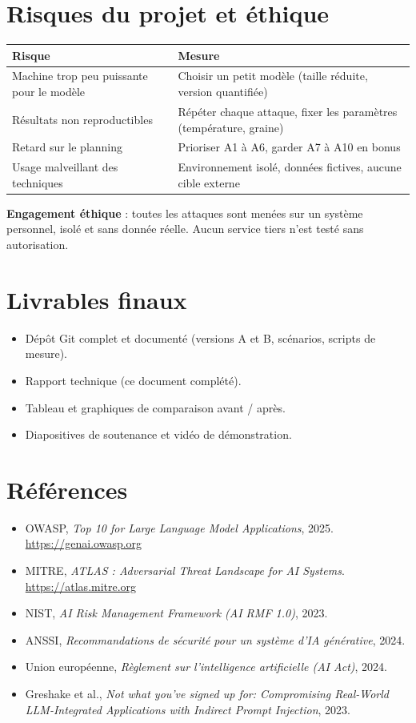 \documentclass[11pt,a4paper]{article}
\begin{document}
\section{Risques du projet et éthique}
\begin{tabularx}{\linewidth}{@{}lY@{}}
\toprule
\textbf{Risque} & \textbf{Mesure} \\
\midrule
Machine trop peu puissante pour le modèle & Choisir un petit modèle (taille réduite, version quantifiée) \\
Résultats non reproductibles & Répéter chaque attaque, fixer les paramètres (température, graine) \\
Retard sur le planning & Prioriser A1 à A6, garder A7 à A10 en bonus \\
Usage malveillant des techniques & Environnement isolé, données fictives, aucune cible externe \\
\bottomrule
\end{tabularx}

\medskip
\textbf{Engagement éthique} : toutes les attaques sont menées sur un système personnel, isolé et sans donnée réelle. Aucun service tiers n'est testé sans autorisation.

\section{Livrables finaux}
\begin{itemize}
  \item Dépôt Git complet et documenté (versions A et B, scénarios, scripts de mesure).
  \item Rapport technique (ce document complété).
  \item Tableau et graphiques de comparaison avant / après.
  \item Diapositives de soutenance et vidéo de démonstration.
\end{itemize}

\section*{Références}
\begin{itemize}
  \item OWASP, \textit{Top 10 for Large Language Model Applications}, 2025. \url{https://genai.owasp.org}
  \item MITRE, \textit{ATLAS : Adversarial Threat Landscape for AI Systems}. \url{https://atlas.mitre.org}
  \item NIST, \textit{AI Risk Management Framework (AI RMF 1.0)}, 2023.
  \item ANSSI, \textit{Recommandations de sécurité pour un système d'IA générative}, 2024.
  \item Union européenne, \textit{Règlement sur l'intelligence artificielle (AI Act)}, 2024.
  \item Greshake et al., \textit{Not what you've signed up for: Compromising Real-World LLM-Integrated Applications with Indirect Prompt Injection}, 2023.
\end{itemize}
\end{document}
